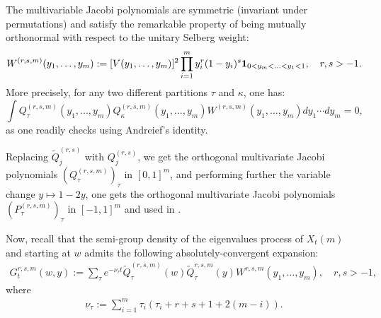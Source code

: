 \documentclass[12pt,reqno]{amsart}
\begin{document}
The multivariable Jacobi polynomials are symmetric (invariant under permutations) and satisfy the remarkable property of being mutually orthonormal with respect to the unitary Selberg weight:
\begin{equation*}
	W^{(r,s,m)}(y_1,\dots, y_m):= [V(y_1, \dots, y_m)]^2\prod_{i=1}^m y_i^r(1-y_i)^s{\bf 1}_{0<y_m<...<y_1<1}, \quad r,s > -1.
\end{equation*}
More precisely, for any two different partitions $\tau$ and $\kappa$, one has:
\begin{equation*}
	\int Q_{\tau}^{(r,s,m)}(y_1,...,y_m)Q_{\kappa}^{(r,s,m)}(y_1,...,y_m)W^{(r,s,m)}(y_1,\dots, y_m)dy_1\cdots dy_m = 0,
\end{equation*}
as one readily checks using Andreief's identity. 

Replacing $\tilde{Q}_j^{(r,s)}$ with $Q_j^{(r,s)}$, we get the orthogonal multivariate Jacobi polynomials $(Q_{\tau}^{(r,s,m)})_{\tau}$ in $[0,1]^m$, and performing further the variable change $y \mapsto 1-2y$, one gets the orthogonal multivariate Jacobi polynomials $(P_{\tau}^{(r,s,m)})_{\tau}$ in $[-1,1]^m$ and used in \cite{MR3498194}.

Now, recall that the semi-group density of the eigenvalues process of $X_t(m)$ and starting at $w$ admits the following absolutely-convergent expansion:
\begin{align*}
	G_t^{r,s,m}(w,y) := \sum_{\tau} e^{-\nu_\tau t}\tilde{Q}_\tau^{(r,s,m)}(w)\tilde{Q}_\tau^{r,s,m}(y) W^{r,s,m}(y_1,\dots, y_m), \quad r,s > -1,
\end{align*}
where
\begin{align*}
	\nu_{\tau} :=\sum_{i=1}^m\tau_i(\tau_i+r+s+1+2(m-i)).
\end{align*}
\end{document}
